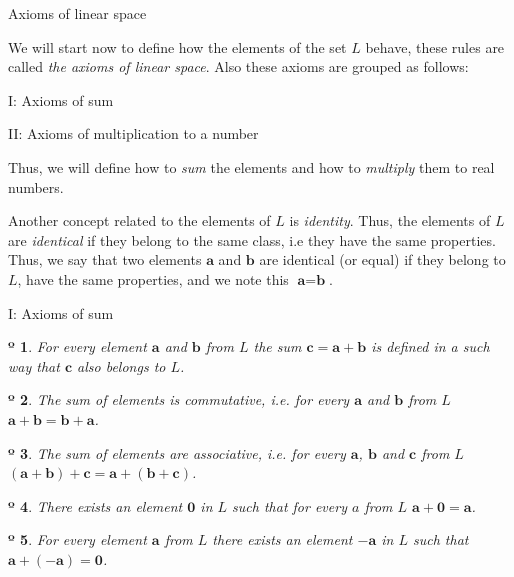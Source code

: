 \documentclass{book}
\newtheorem{axiom}{º}
\begin{document}
\begin{section}{Axioms of linear space}

We will start now to define how the elements of the set $L$ behave, these rules are called \emph{the axioms of linear space}. Also these axioms are grouped as follows:


I: Axioms of sum

II: Axioms of multiplication to a number

Thus, we will define how to \emph{sum} the elements and how to \emph{multiply} them to real numbers.

Another concept related to the elements of $L$ is \emph{identity}. Thus, the elements of $L$ are \emph{identical} if they belong to the same class, i.e they have the same properties. Thus, we say that two elements $\textbf{a}$ and $\textbf{b}$ are identical (or equal) if they belong to $L$, have the same properties, and we note this $\textbf{a} = \textbf{b}$.

\begin{subsection}{I: Axioms of sum}

\begin{axiom} For every element $\textbf{a}$ and $\textbf{b}$ from $L$ the sum $\textbf{c} = \textbf{a} + \textbf{b}$ is defined in a such way that $\textbf{c}$ also belongs to $L$.
\end{axiom}

\begin{axiom}The sum of elements is commutative, i.e. for every $\textbf{a}$ and $\textbf{b}$ from $L$
$\textbf{a} + \textbf{b} = \textbf{b} + \textbf{a}$.
\end{axiom}

\begin{axiom} The sum of elements are associative, i.e. for every $\textbf{a}$, $\textbf{b}$ and $\textbf{c}$ from $L$
$(\textbf{a} + \textbf{b}) + \textbf{c} = \textbf{a} + (\textbf{b} + \textbf{c})$.
\end{axiom}

\begin{axiom} There exists an element {$\textbf{0}$} in $L$ such that for every $a$ from $L$  $\textbf{a} + \textbf{0} = \textbf{a}$.
\end{axiom}

\begin{axiom} For every element $\textbf{a}$ from $L$ there exists an element {$-\textbf{a}$} in $L$ such that $\textbf{a} + (-\textbf{a}) = \textbf{0}$.
\end{axiom}


\end{subsection}
\end{section}
\end{document}
